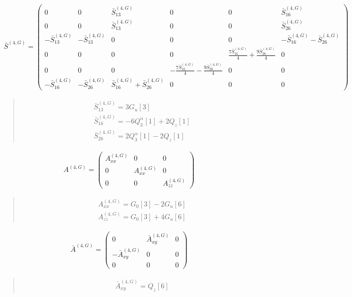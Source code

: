 \documentclass[fleqn,10pt]{jsarticle}
\begin{document}
\begin{align*}
\bar{S}^{(4,G)} = \begin{pmatrix} 0 & 0 & \bar{S}^{(4,G)}_{13} & 0 & 0 & \bar{S}^{(4,G)}_{16} \\ 0 & 0 & \bar{S}^{(4,G)}_{13} & 0 & 0 & \bar{S}^{(4,G)}_{26} \\ - \bar{S}^{(4,G)}_{13} & - \bar{S}^{(4,G)}_{13} & 0 & 0 & 0 & - \bar{S}^{(4,G)}_{16} - \bar{S}^{(4,G)}_{26} \\ 0 & 0 & 0 & 0 & \frac{7 \bar{S}^{(4,G)}_{16}}{4} + \frac{9 \bar{S}^{(4,G)}_{26}}{4} & 0 \\ 0 & 0 & 0 & - \frac{7 \bar{S}^{(4,G)}_{16}}{4} - \frac{9 \bar{S}^{(4,G)}_{26}}{4} & 0 & 0 \\ - \bar{S}^{(4,G)}_{16} & - \bar{S}^{(4,G)}_{26} & \bar{S}^{(4,G)}_{16} + \bar{S}^{(4,G)}_{26} & 0 & 0 & 0 \end{pmatrix}
\end{align*}
\begin{quote}
\begin{align*}
& \bar{S}^{(4,G)}_{13} = 3 G_{u}[3] \\
& \bar{S}^{(4,G)}_{16} = - 6 Q_{3}^{\alpha}[1] + 2 Q_{z}[1] \\
& \bar{S}^{(4,G)}_{26} = 2 Q_{3}^{\alpha}[1] - 2 Q_{z}[1]
\end{align*}
\end{quote}
\begin{align*}
A^{(4,G)} = \begin{pmatrix} A^{(4,G)}_{xx} & 0 & 0 \\ 0 & A^{(4,G)}_{xx} & 0 \\ 0 & 0 & A^{(4,G)}_{zz} \end{pmatrix}
\end{align*}
\begin{quote}
\begin{align*}
& A^{(4,G)}_{xx} = G_{0}[3] - 2 G_{u}[6] \\
& A^{(4,G)}_{zz} = G_{0}[3] + 4 G_{u}[6]
\end{align*}
\end{quote}
\begin{align*}
\bar{A}^{(4,G)} = \begin{pmatrix} 0 & \bar{A}^{(4,G)}_{xy} & 0 \\ - \bar{A}^{(4,G)}_{xy} & 0 & 0 \\ 0 & 0 & 0 \end{pmatrix}
\end{align*}
\begin{quote}
\begin{align*}
& \bar{A}^{(4,G)}_{xy} = Q_{z}[6]
\end{align*}
\end{quote}
\end{document}
